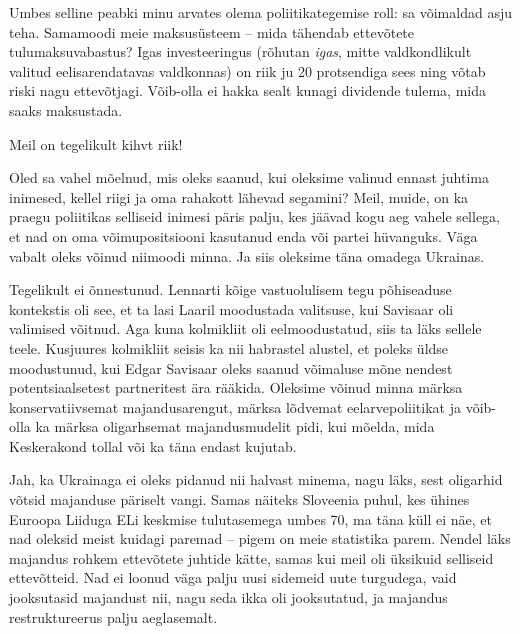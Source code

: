 Umbes selline peabki minu arvates olema poliitikategemise roll: sa 
võimaldad asju teha. Samamoodi meie maksusüsteem -- mida tähendab ettevõtete tulumaksuvabastus? Igas investeeringus (rõhutan \emph{igas}, mitte valdkondlikult valitud 
eelisarendatavas valdkonnas) on riik ju 20 protsendiga sees ning võtab 
riski nagu ettevõtjagi. Võib-olla ei hakka sealt kunagi dividende tulema, mida 
saaks maksustada.

Meil on tegelikult kihvt riik!


Oled sa vahel mõelnud, mis oleks saanud, kui oleksime valinud ennast juhtima 
inimesed, kellel riigi ja oma rahakott lähevad segamini? Meil, muide, on ka 
praegu poliitikas selliseid inimesi päris palju, kes jäävad kogu aeg vahele 
sellega, et nad on oma võimupositsiooni kasutanud enda või partei 
hüvanguks. Väga vabalt oleks võinud niimoodi minna. Ja siis 
oleksime täna omadega Ukrainas.


Tegelikult ei õnnestunud. Lennarti kõige vastuolulisem tegu 
põhiseaduse kontekstis oli see, et ta lasi Laaril moodustada valitsuse, kui 
Savisaar oli valimised võitnud. Aga kuna kolmikliit oli eelmoodustatud, siis ta läks sellele teele. Kusjuures kolmikliit seisis ka nii habrastel alustel, et poleks üldse 
moodustunud, kui Edgar Savisaar oleks saanud 
võimaluse mõne nendest potentsiaalsetest partneritest ära rääkida. Oleksime võinud 
minna märksa konservatiivsemat majandusarengut, märksa lõdvemat eelarvepoliitikat ja võib-olla ka märksa oligarhsemat majandusmudelit pidi, kui 
mõelda, mida Keskerakond tollal või ka täna endast kujutab.


Jah, ka Ukrainaga ei oleks pidanud nii halvast minema, nagu läks, sest
oligarhid võtsid majanduse päriselt vangi. Samas näiteks Sloveenia puhul, kes ühines Euroopa Liiduga ELi keskmise 
tulutasemega umbes 70, ma täna küll ei näe, et nad oleksid meist kuidagi 
paremad -- pigem on meie statistika parem. Nendel läks
majandus rohkem ettevõtete juhtide kätte, samas kui meil oli üksikuid 
selliseid ettevõtteid. Nad ei loonud väga palju uusi sidemeid uute turgudega, 
vaid jooksutasid majandust nii, nagu seda ikka oli jooksutatud, ja majandus 
restruktureerus palju aeglasemalt. 

